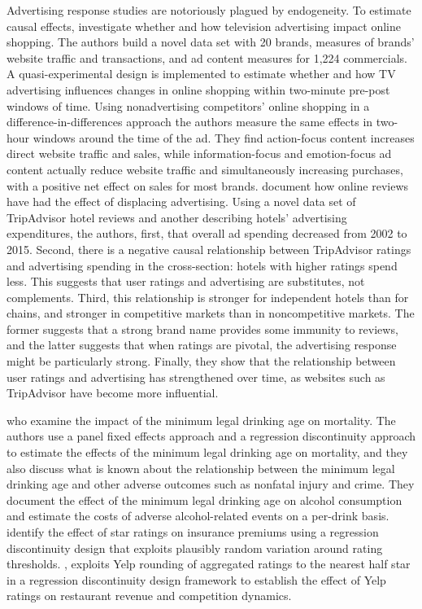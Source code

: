Advertising response studies are notoriously plagued by endogeneity. To estimate causal effects, \citet{liaukonyte2015television} investigate whether and how television advertising impact online shopping. The authors build a novel data set with 20 brands, measures of brands’ website traffic and transactions, and ad content measures for 1,224 commercials.  A quasi-experimental design is implemented to estimate whether and how TV advertising influences changes in online shopping within two-minute pre-post windows of time. Using nonadvertising competitors’ online shopping in a difference-in-differences approach the authors measure the same effects in two-hour windows around the time of the ad. They find action-focus content increases direct website traffic and sales, while information-focus and emotion-focus ad content actually reduce website traffic and simultaneously increasing purchases, with a positive net effect on sales for most brands. 
\citet{hollenbeck2017advertising} document how online reviews have had the effect of displacing advertising. Using a novel data set of TripAdvisor hotel reviews and another describing hotels' advertising expenditures, the authors, first, that overall ad spending decreased from 2002 to 2015. Second, there is a negative causal relationship between TripAdvisor ratings and advertising spending in the cross-section: hotels with higher ratings spend less. This suggests that user ratings and advertising are substitutes, not complements. Third, this relationship is stronger for independent hotels than for chains, and stronger in competitive markets than in noncompetitive markets. The former suggests that a strong brand name provides some immunity to reviews, and the latter suggests that when ratings are pivotal, the advertising response might be particularly strong. Finally, they show that the relationship between user ratings and advertising has strengthened over time, as websites such as TripAdvisor have become more influential.

\citet{carpenter2011minimum} who examine the impact of the minimum legal drinking age on mortality. The authors use a panel fixed effects approach and a regression discontinuity approach to estimate the effects of the minimum legal drinking age on mortality, and they also discuss what is known about the relationship between the minimum legal drinking age and other adverse outcomes such as nonfatal injury and crime. They document the effect of the minimum legal drinking age on alcohol consumption and estimate the costs of adverse alcohol-related events on a per-drink basis. \citet{mccarthy2015quality} identify the effect of star ratings on insurance premiums using a regression discontinuity design that exploits plausibly random variation around rating thresholds.  \citet{luca2011reviews}, exploits Yelp rounding of aggregated ratings to the nearest half star in a regression discontinuity design framework to establish the effect of Yelp ratings on restaurant revenue and competition dynamics. 

